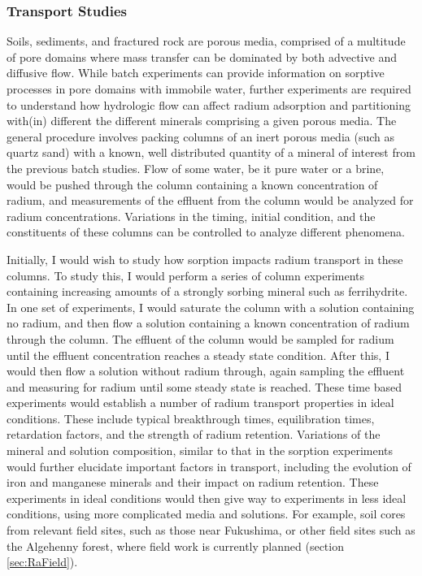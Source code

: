 \documentclass[twoside,12pt,titlepage]{article}
\begin{document}
\subsubsection{Transport Studies}
\label{sec:RaTransport}
Soils, sediments, and fractured rock are porous media, comprised of a multitude of pore domains where mass transfer can be dominated by both advective and diffusive flow. While batch experiments can provide information on sorptive processes in pore domains with immobile water, further experiments are required to understand how hydrologic flow can affect radium adsorption and partitioning with(in) different the different minerals comprising a given porous media. The general procedure involves packing columns of an inert porous media (such as quartz sand) with a known, well distributed quantity of a mineral of interest from the previous batch studies. Flow of some water, be it pure water or a brine, would be pushed through the column containing a known concentration of radium, and measurements of the effluent from the column would be analyzed for radium concentrations. Variations in the timing, initial condition, and the constituents of these columns can be controlled to analyze different phenomena.
\par Initially, I would wish to study how sorption impacts radium transport in these columns. To study this, I would perform a series of column experiments containing increasing amounts of a strongly sorbing mineral such as ferrihydrite. In one set of experiments, I would saturate the column with a solution containing no radium, and then flow a solution containing a known concentration of radium through the column. The effluent of the column would be sampled for radium until the effluent concentration reaches a steady state condition. After this, I would then flow a solution without radium through, again sampling the effluent and measuring for radium until some steady state is reached. These time based experiments would establish a number of radium transport properties in ideal conditions. These include typical breakthrough times, equilibration times, retardation factors, and the strength of radium retention. Variations of the mineral and solution composition, similar to that in the sorption experiments would further elucidate important factors in transport, including the evolution of iron and manganese minerals and their impact on radium retention. These experiments in ideal conditions would then give way to experiments in less ideal conditions, using more complicated media and solutions. For example, soil cores from relevant field sites, such as those near Fukushima, or other field sites such as the Algehenny forest, where field work is currently planned (section \ref{sec:RaField}).
\end{document}
